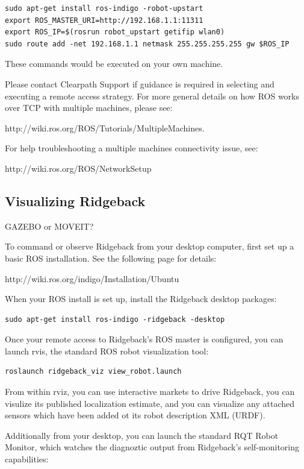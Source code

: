 \documentclass[]{clearpath-latex/clearpath-manual}
\begin{document}
\begin{lstlisting} 
sudo apt-get install ros-indigo -robot-upstart
export ROS_MASTER_URI=http://192.168.1.1:11311
export ROS_IP=$(rosrun robot_upstart getifip wlan0)
sudo route add -net 192.168.1.1 netmask 255.255.255.255 gw $ROS_IP
\end{lstlisting}

These commands would be executed on your own machine.

Please contact Clearpath Support if guidance is required in selecting and executing a remote access strategy.
For more general details on how ROS works over TCP with multiple machines, please see:

http://wiki.ros.org/ROS/Tutorials/MultipleMachines.

For help troubleshooting a multiple machines connectivity issue, see:

http://wiki.ros.org/ROS/NetworkSetup


\subsection{Visualizing Ridgeback}

GAZEBO or MOVEIT? 

To command or observe Ridgeback from your desktop computer, first set up a basic ROS installation.  See the following page for details:

http://wiki.ros.org/indigo/Installation/Ubuntu

When your ROS install is set up, install the Ridgeback desktop packages:

\begin{lstlisting}
sudo apt-get install ros-indigo -ridgeback -desktop
\end{lstlisting}

Once your remote access to Ridgeback's ROS master is configured, you can launch rvis, the standard ROS robot visualization tool:

\begin{lstlisting}
roslaunch ridgeback_viz view_robot.launch
\end{lstlisting}

From within rviz, you can use interactive markets to drive Ridgeback, you can visulize its published localization estimate, and you can visualize any attached sensors which have been added ot its robot description XML (URDF).  

Additionally from your desktop, you can launch the standard RQT Robot Monitor, which watches the diagnoztic output from Ridgeback's self-monitoring capabilities:
\end{document}
